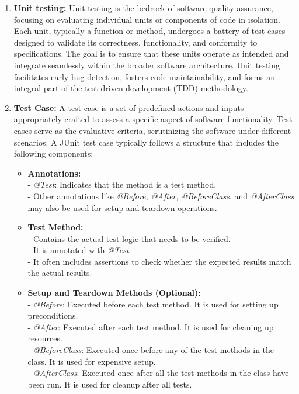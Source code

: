 \begin{enumerate}
  \item \textbf{Unit testing:} Unit testing is the bedrock of software quality assurance, focusing on evaluating individual units or components of code in isolation. Each unit, typically a function or method, undergoes a battery of test cases designed to validate its correctness, functionality, and conformity to specifications. The goal is to ensure that these units operate as intended and integrate seamlessly within the broader software architecture. Unit testing facilitates early bug detection, fosters code maintainability, and forms an integral part of the test-driven development (TDD) methodology.
  \item \textbf{Test Case:} A test case is a set of predefined actions and inputs appropriately crafted to assess a specific aspect of software functionality. Test cases serve as the evaluative criteria, scrutinizing the software under different scenarios. A JUnit\cite{noauthor_junit_nodate} test case typically follows a structure that includes the following components:

    \begin{itemize}
        \item \textbf{Annotations:} \\
        - \textit{@Test}: Indicates that the method is a test method. \\
        - Other annotations like \textit{@Before, @After, @BeforeClass}, and \textit{@AfterClass} may also be used for setup and teardown operations.

        \item \textbf{Test Method:} \\
        - Contains the actual test logic that needs to be verified. \\
        - It is annotated with \textit{@Test}. \\
        - It often includes assertions to check whether the expected results match the actual results.

        \item \textbf{Setup and Teardown Methods (Optional):} \\
        - \textit{@Before}: Executed before each test method. It is used for setting up preconditions. \\
        - \textit{@After}: Executed after each test method. It is used for cleaning up resources. \\
        - \textit{@BeforeClass}: Executed once before any of the test methods in the class. It is used for expensive setup. \\
        - \textit{@AfterClass}: Executed once after all the test methods in the class have been run. It is used for cleanup after all tests.


\end{itemize}
\end{enumerate}
